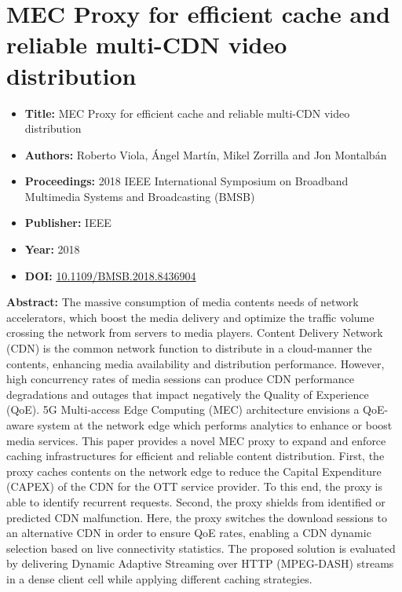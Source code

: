 

\section[MEC Proxy for efficient cache and reliable multi-CDN video distribution]{MEC Proxy for efficient cache and reliable multi-CDN video distribution}
\label{chap:BMSB2018}
\begin{itemize} \itemsep1pt\parskip0pt
	\item \textbf{Title:} MEC Proxy for efficient cache and reliable multi-CDN video distribution
	\item \textbf{Authors:} Roberto Viola, \'Angel Mart\'in, Mikel Zorrilla and Jon Montalb\'an
	\item \textbf{Proceedings:} 2018 IEEE International Symposium on Broadband Multimedia Systems and Broadcasting (BMSB)
	\item \textbf{Publisher:} IEEE
	\item \textbf{Year:} 2018
	\item \textbf{DOI:}  \url{10.1109/BMSB.2018.8436904}
\end{itemize}	

\textbf{Abstract:} The massive consumption of media contents needs of network accelerators, which boost the media delivery and optimize the traffic volume crossing the network from servers to media players. Content Delivery Network (CDN) is the common network function to distribute in a cloud-manner the contents, enhancing media availability and distribution performance. However, high concurrency rates of media sessions can produce CDN performance degradations and outages that impact negatively the Quality of Experience (QoE). 5G Multi-access Edge Computing (MEC) architecture envisions a QoE-aware system at the network edge which performs analytics to enhance or boost media services. This paper provides a novel MEC proxy to expand and enforce caching infrastructures for efficient and reliable content distribution. First, the proxy caches contents on the network edge to reduce the Capital Expenditure (CAPEX) of the CDN for the OTT service provider. To this end, the proxy is able to identify recurrent requests. Second, the proxy shields from identified or predicted CDN malfunction. Here, the proxy switches the download sessions to an alternative CDN in order to ensure QoE rates, enabling a CDN dynamic selection based on live connectivity statistics. The proposed solution is evaluated by delivering Dynamic Adaptive Streaming over HTTP (MPEG-DASH) streams in a dense client cell while applying different caching strategies.


